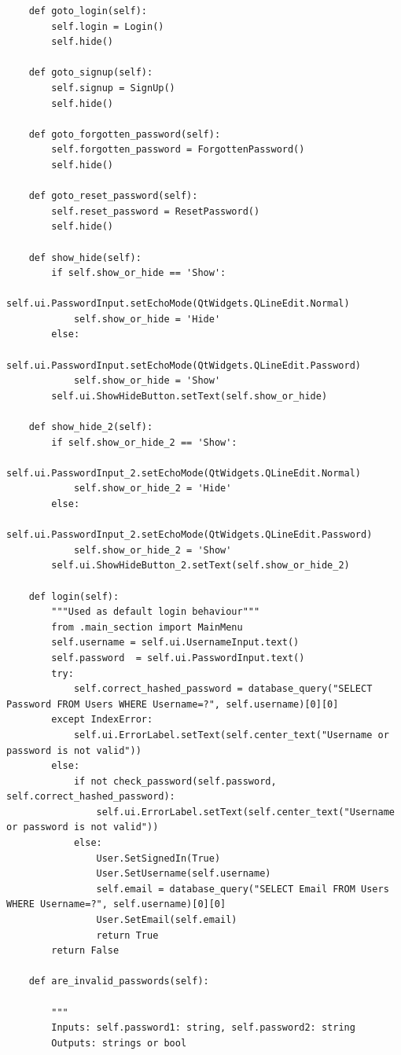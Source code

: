 \documentclass{article}
\begin{document}
\begin{lstlisting}
    def goto_login(self):
        self.login = Login()
        self.hide()

    def goto_signup(self):
        self.signup = SignUp()
        self.hide()

    def goto_forgotten_password(self):
        self.forgotten_password = ForgottenPassword()
        self.hide()

    def goto_reset_password(self):
        self.reset_password = ResetPassword()
        self.hide()

    def show_hide(self):
        if self.show_or_hide == 'Show':
            self.ui.PasswordInput.setEchoMode(QtWidgets.QLineEdit.Normal)
            self.show_or_hide = 'Hide'
        else:
            self.ui.PasswordInput.setEchoMode(QtWidgets.QLineEdit.Password)
            self.show_or_hide = 'Show'
        self.ui.ShowHideButton.setText(self.show_or_hide)

    def show_hide_2(self):
        if self.show_or_hide_2 == 'Show':
            self.ui.PasswordInput_2.setEchoMode(QtWidgets.QLineEdit.Normal)
            self.show_or_hide_2 = 'Hide'
        else:
            self.ui.PasswordInput_2.setEchoMode(QtWidgets.QLineEdit.Password)
            self.show_or_hide_2 = 'Show'
        self.ui.ShowHideButton_2.setText(self.show_or_hide_2)

    def login(self):
        """Used as default login behaviour"""
        from .main_section import MainMenu
        self.username = self.ui.UsernameInput.text()
        self.password  = self.ui.PasswordInput.text()
        try:
            self.correct_hashed_password = database_query("SELECT Password FROM Users WHERE Username=?", self.username)[0][0]
        except IndexError:
            self.ui.ErrorLabel.setText(self.center_text("Username or password is not valid"))
        else:
            if not check_password(self.password, self.correct_hashed_password):
                self.ui.ErrorLabel.setText(self.center_text("Username or password is not valid"))
            else:
                User.SetSignedIn(True)
                User.SetUsername(self.username)
                self.email = database_query("SELECT Email FROM Users WHERE Username=?", self.username)[0][0]
                User.SetEmail(self.email)
                return True
        return False

    def are_invalid_passwords(self):

        """
        Inputs: self.password1: string, self.password2: string
        Outputs: strings or bool


\end{lstlisting}
\end{document}
